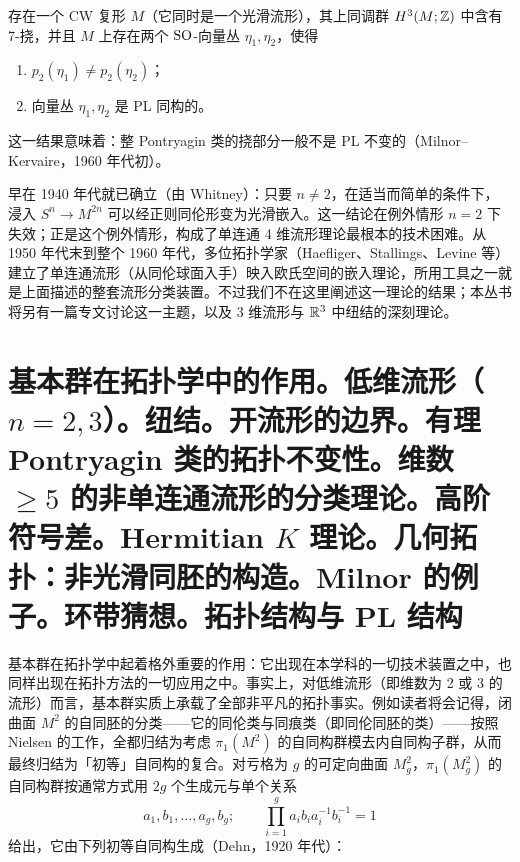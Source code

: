 \begin{corollary*}{}
存在一个 CW 复形 $M$（它同时是一个光滑流形），其上同调群 $H^{3}(M;\mathbb{Z})$ 中含有 7-挠，并且 $M$ 上存在两个 $\mathrm{SO}$-向量丛 $\eta_{1},\eta_{2}$，使得
\begin{enumerate}[label=(\roman*),leftmargin=2.4em,itemsep=0pt,topsep=2pt]
  \item $p_{2}(\eta_{1})\neq p_{2}(\eta_{2})$；
  \item 向量丛 $\eta_{1},\eta_{2}$ 是 PL 同构的。
\end{enumerate}
\end{corollary*}

这一结果意味着：整 Pontryagin 类的挠部分一般不是 PL 不变的（Milnor--Kervaire，1960 年代初）。

早在 1940 年代就已确立（由 Whitney）：只要 $n\neq 2$，在适当而简单的条件下，浸入 $S^{n}\to M^{2n}$ 可以经正则同伦形变为光滑嵌入。这一结论在例外情形 $n=2$ 下失效；正是这个例外情形，构成了单连通 4 维流形理论最根本的技术困难。从 1950 年代末到整个 1960 年代，多位拓扑学家（Haefliger、Stallings、Levine 等）建立了单连通流形（从同伦球面入手）映入欧氏空间的嵌入理论，所用工具之一就是上面描述的整套流形分类装置。不过我们不在这里阐述这一理论的结果；本丛书将另有一篇专文讨论这一主题，以及 3 维流形与 $\mathbb{R}^{3}$ 中纽结的深刻理论。

\section[基本群的作用。 低维流形。 高维分类理论。 高阶符号差]{基本群在拓扑学中的作用。低维流形（$n=2,3$）。纽结。开流形的边界。有理 Pontryagin 类的拓扑不变性。维数 $\ge 5$ 的非单连通流形的分类理论。高阶符号差。Hermitian $K$ 理论。几何拓扑：非光滑同胚的构造。Milnor 的例子。环带猜想。拓扑结构与 PL 结构}


基本群在拓扑学中起着格外重要的作用：它出现在本学科的一切技术装置之中，也同样出现在拓扑方法的一切应用之中。事实上，对低维流形（即维数为 2 或 3 的流形）而言，基本群实质上承载了全部非平凡的拓扑事实。例如读者将会记得，闭曲面 $M^{2}$ 的自同胚的分类——它的同伦类与同痕类（即同伦同胚的类）——按照 Nielsen 的工作，全都归结为考虑 $\pi_{1}(M^{2})$ 的自同构群模去内自同构子群，从而最终归结为「初等」自同构的复合。对亏格为 $g$ 的可定向曲面 $M_{g}^{2}$，$\pi_{1}(M_{g}^{2})$ 的自同构群按通常方式用 $2g$ 个生成元与单个关系
\[
a_{1},b_{1},\dots,a_{g},b_{g};\qquad \prod_{i=1}^{g}a_{i}b_{i}a_{i}^{-1}b_{i}^{-1}=1
\]
给出，它由下列初等自同构生成（Dehn，1920 年代）：

